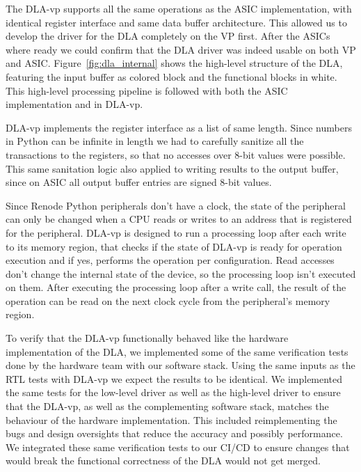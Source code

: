 \documentclass[12pt,a4paper,english
]{tunithesis}
\begin{document}
The DLA-vp supports all the same operations as the ASIC implementation, with identical register interface and same data buffer architecture. This allowed us to develop the driver for the DLA completely on the VP first. After the ASICs where ready we could confirm that the DLA driver was indeed usable on both VP and ASIC. Figure~\ref{fig:dla_internal} shows the high-level structure of the DLA, featuring the input buffer as colored block and the functional blocks in white. This high-level processing pipeline is followed with both the ASIC implementation and in DLA-vp.

DLA-vp implements the register interface as a list of same length. Since numbers in Python can be infinite in length we had to carefully sanitize all the transactions to the registers, so that no accesses over 8-bit values were possible. This same sanitation logic also applied to writing results to the output buffer, since on ASIC all output buffer entries are signed 8-bit values.

Since Renode Python peripherals don't have a clock, the state of the peripheral can only be changed when a CPU reads or writes to an address that is registered for the peripheral. DLA-vp is designed to run a processing loop after each write to its memory region, that checks if the state of DLA-vp is ready for operation execution and if yes, performs the operation per configuration. Read accesses don't change the internal state of the device, so the processing loop isn't executed on them. After executing the processing loop after a write call, the result of the operation can be read on the next clock cycle from the peripheral's memory region.

To verify that the DLA-vp functionally behaved like the hardware implementation of the DLA, we implemented some of the same verification tests done by the hardware team with our software stack. Using the same inputs as the RTL tests with DLA-vp we expect the results to be identical. We implemented the same tests for the low-level driver as well as the high-level driver to ensure that the DLA-vp, as well as the complementing software stack, matches the behaviour of the hardware implementation. This included reimplementing the bugs and design oversights that reduce the accuracy and possibly performance. We integrated these same verification tests to our CI/CD to ensure changes that would break the functional correctness of the DLA would not get merged.
\end{document}
